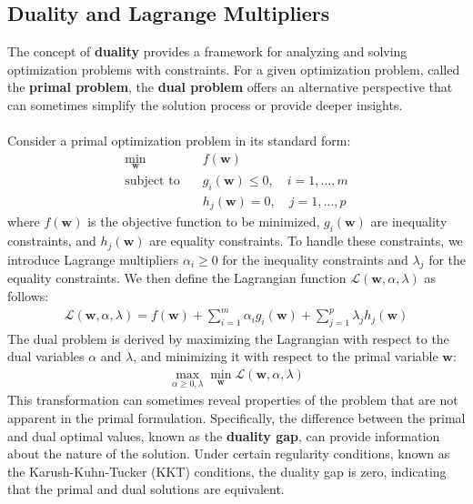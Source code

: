 \documentclass{article}
\begin{document}
\subsection{Duality and Lagrange Multipliers}
The concept of \textbf{duality} provides a framework for analyzing and solving optimization problems with constraints. For a given optimization problem, called the \textbf{primal problem}, the \textbf{dual problem} offers an alternative perspective that can sometimes simplify the solution process or provide deeper insights.
\\ \\
Consider a primal optimization problem in its standard form:
\begin{align*}
    \min_{\mathbf{w}} \quad & f(\mathbf{w}) \\
    \text{subject to} \quad & g_i(\mathbf{w}) \leq 0, \quad i = 1, \dots, m \\
    & h_j(\mathbf{w}) = 0, \quad j = 1, \dots, p
\end{align*}
where \( f(\mathbf{w}) \) is the objective function to be minimized, \( g_i(\mathbf{w}) \) are inequality constraints, and \( h_j(\mathbf{w}) \) are equality constraints. To handle these constraints, we introduce Lagrange multipliers \( \alpha_i \geq 0 \) for the inequality constraints and \( \lambda_j \) for the equality constraints. We then define the Lagrangian function \( \mathcal{L}(\mathbf{w}, \alpha, \lambda) \) as follows:
\begin{align*}
    \mathcal{L}(\mathbf{w}, \alpha, \lambda) = f(\mathbf{w}) + \sum_{i=1}^{m} \alpha_i g_i(\mathbf{w}) + \sum_{j=1}^{p} \lambda_j h_j(\mathbf{w})
\end{align*}
The dual problem is derived by maximizing the Lagrangian with respect to the dual variables \( \alpha \) and \( \lambda \), and minimizing it with respect to the primal variable \( \mathbf{w} \):
\begin{align*}
    \max_{\alpha \geq 0, \lambda} \min_{\mathbf{w}} \mathcal{L}(\mathbf{w}, \alpha, \lambda)
\end{align*}
This transformation can sometimes reveal properties of the problem that are not apparent in the primal formulation. Specifically, the difference between the primal and dual optimal values, known as the \textbf{duality gap}, can provide information about the nature of the solution. Under certain regularity conditions, known as the Karush-Kuhn-Tucker (KKT) conditions, the duality gap is zero, indicating that the primal and dual solutions are equivalent.
\\ \\
\end{document}
